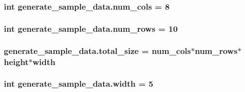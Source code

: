 \hypertarget{namespacegenerate__sample__data_a561c187196bf47070154df3d2d75cb51}{
\subsubsection[{num\+\_\+cols}]{\setlength{\rightskip}{0pt plus 5cm}int generate\+\_\+sample\+\_\+data.\+num\+\_\+cols = 8}}\label{namespacegenerate__sample__data_a561c187196bf47070154df3d2d75cb51}
\hypertarget{namespacegenerate__sample__data_a9facebf11fedbe0a7a1bd753b543c3ee}{
\subsubsection[{num\+\_\+rows}]{\setlength{\rightskip}{0pt plus 5cm}int generate\+\_\+sample\+\_\+data.\+num\+\_\+rows = 10}}\label{namespacegenerate__sample__data_a9facebf11fedbe0a7a1bd753b543c3ee}
\hypertarget{namespacegenerate__sample__data_ac8b970b8c3bac43e04c22fe0a745e301}{
\subsubsection[{total\+\_\+size}]{\setlength{\rightskip}{0pt plus 5cm}generate\+\_\+sample\+\_\+data.\+total\+\_\+size = {\bf num\+\_\+cols}$\ast${\bf num\+\_\+rows}$\ast${\bf height}$\ast${\bf width}}}\label{namespacegenerate__sample__data_ac8b970b8c3bac43e04c22fe0a745e301}
\hypertarget{namespacegenerate__sample__data_a2264268ecd1bdb7d0617a9c36ed42939}{
\subsubsection[{width}]{\setlength{\rightskip}{0pt plus 5cm}int generate\+\_\+sample\+\_\+data.\+width = 5}}\label{namespacegenerate__sample__data_a2264268ecd1bdb7d0617a9c36ed42939}
